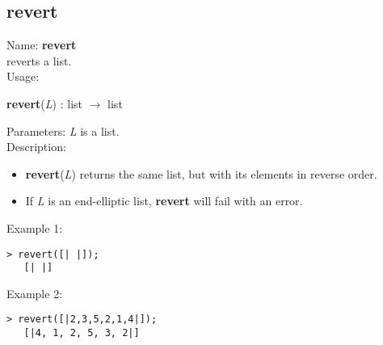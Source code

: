 \subsection{ revert }
\noindent Name: \textbf{revert}\\
reverts a list.\\

\noindent Usage: 
\begin{center}
\textbf{revert}(\emph{L}) : \textsf{list} $\rightarrow$ \textsf{list}\\
\end{center}
Parameters: 
\emph{L} is a list.\\

\noindent Description: \begin{itemize}

\item \textbf{revert}(\emph{L}) returns the same list, but with its elements in reverse order.

\item If \emph{L} is an end-elliptic list, \textbf{revert} will fail with an error.
\end{itemize}
\noindent Example 1: 
\begin{center}\begin{minipage}{14.8cm}\begin{Verbatim}[frame=single]
   > revert([| |]);
   [| |]
\end{Verbatim}
\end{minipage}\end{center}
\noindent Example 2: 
\begin{center}\begin{minipage}{14.8cm}\begin{Verbatim}[frame=single]
   > revert([|2,3,5,2,1,4|]);
   [|4, 1, 2, 5, 3, 2|]
\end{Verbatim}
\end{minipage}\end{center}
